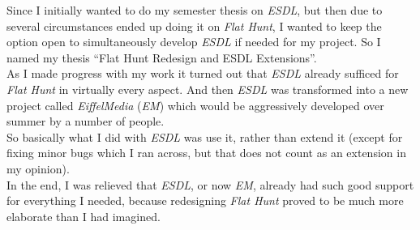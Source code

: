 Since I initially wanted to do my semester thesis on \emph{ESDL}, but then due to several circumstances ended up doing it on \emph{Flat Hunt}, I wanted to keep the option open to simultaneously develop \emph{ESDL} if needed for my project. So I named my thesis ``Flat Hunt Redesign and ESDL Extensions''.\\ 
As I made progress with my work it turned out that \emph{ESDL} already sufficed for \emph{Flat Hunt} in virtually every aspect. And then \emph{ESDL} was transformed into a new project called \emph{EiffelMedia} (\emph{EM}) which would be aggressively developed over summer by a number of people. \\
So basically what I did with \emph{ESDL} was use it, rather than extend it (except for fixing minor bugs which I ran across, but that does not count as an extension in my opinion).\\
In the end, I was relieved that \emph{ESDL}, or now \emph{EM}, already had such good support for everything I needed, because redesigning \emph{Flat Hunt} proved to be much more elaborate than I had imagined.
